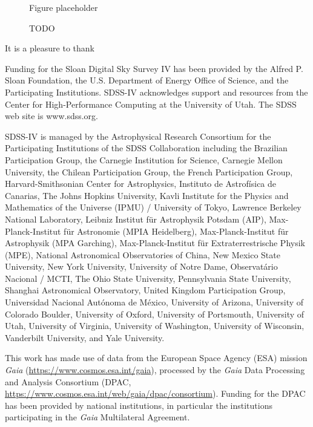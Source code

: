 \documentclass[modern]{aastex63}
\begin{document}
\begin{figure}[!t]
\begin{center}
{\color{red} Figure placeholder}
\end{center}
\caption{%
TODO
\label{fig:chiplots}
}
\end{figure}




\acknowledgements

It is a pleasure to thank


Funding for the Sloan Digital Sky Survey IV has been provided by the Alfred P.
Sloan Foundation, the U.S. Department of Energy Office of Science, and the
Participating Institutions. SDSS-IV acknowledges support and resources from the
Center for High-Performance Computing at the University of Utah. The SDSS web
site is www.sdss.org.

SDSS-IV is managed by the Astrophysical Research Consortium for the
Participating Institutions of the SDSS Collaboration including the Brazilian
Participation Group, the Carnegie Institution for Science, Carnegie Mellon
University, the Chilean Participation Group, the French Participation Group,
Harvard-Smithsonian Center for Astrophysics, Instituto de Astrof\'isica de
Canarias, The Johns Hopkins University, Kavli Institute for the Physics and
Mathematics of the Universe (IPMU) / University of Tokyo, Lawrence Berkeley
National Laboratory, Leibniz Institut f\"ur Astrophysik Potsdam (AIP),
Max-Planck-Institut f\"ur Astronomie (MPIA Heidelberg), Max-Planck-Institut
f\"ur Astrophysik (MPA Garching), Max-Planck-Institut f\"ur Extraterrestrische
Physik (MPE), National Astronomical Observatories of China, New Mexico State
University, New York University, University of Notre Dame, Observat\'ario
Nacional / MCTI, The Ohio State University, Pennsylvania State University,
Shanghai Astronomical Observatory, United Kingdom Participation Group,
Universidad Nacional Aut\'onoma de M\'exico, University of Arizona, University
of Colorado Boulder, University of Oxford, University of Portsmouth, University
of Utah, University of Virginia, University of Washington, University of
Wisconsin, Vanderbilt University, and Yale University.

This work has made use of data from the European Space Agency (ESA) mission
{\it Gaia} (\url{https://www.cosmos.esa.int/gaia}), processed by the {\it Gaia}
Data Processing and Analysis Consortium (DPAC,
\url{https://www.cosmos.esa.int/web/gaia/dpac/consortium}). Funding for the DPAC
has been provided by national institutions, in particular the institutions
participating in the {\it Gaia} Multilateral Agreement.
\end{document}
